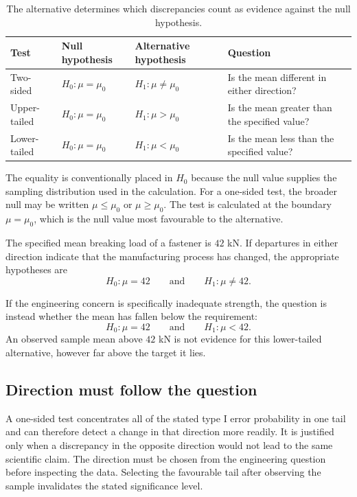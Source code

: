 \begin{table}[htbp]
\centering
\caption{The alternative determines which discrepancies count as evidence against the null hypothesis.}
\label{tab:alternative-directions}
\begin{tabularx}{\textwidth}{@{}lll>{\raggedright\arraybackslash}X@{}}
\toprule
Test & Null hypothesis & Alternative hypothesis & Question \\
\midrule
Two-sided & $H_0:\mu=\mu_0$ & $H_1:\mu\neq\mu_0$ & Is the mean different in either direction? \\
Upper-tailed & $H_0:\mu=\mu_0$ & $H_1:\mu>\mu_0$ & Is the mean greater than the specified value? \\
Lower-tailed & $H_0:\mu=\mu_0$ & $H_1:\mu<\mu_0$ & Is the mean less than the specified value? \\
\bottomrule
\end{tabularx}
\end{table}

The equality is conventionally placed in $H_0$ because the null value supplies the sampling distribution used in the calculation. For a one-sided test, the broader null may be written $\mu\leq\mu_0$ or $\mu\geq\mu_0$. The test is calculated at the boundary $\mu=\mu_0$, which is the null value most favourable to the alternative.

\begin{example}\par
The specified mean breaking load of a fastener is $42$ kN. If departures in either direction indicate that the manufacturing process has changed, the appropriate hypotheses are
\[
H_0:\mu=42
\qquad\text{and}\qquad
H_1:\mu\neq42.
\]

If the engineering concern is specifically inadequate strength, the question is instead whether the mean has fallen below the requirement:
\[
H_0:\mu=42
\qquad\text{and}\qquad
H_1:\mu<42.
\]
An observed sample mean above $42$ kN is not evidence for this lower-tailed alternative, however far above the target it lies.
\end{example}

\subsection{Direction must follow the question}

A one-sided test concentrates all of the stated type I error probability in one tail and can therefore detect a change in that direction more readily. It is justified only when a discrepancy in the opposite direction would not lead to the same scientific claim. The direction must be chosen from the engineering question before inspecting the data. Selecting the favourable tail after observing the sample invalidates the stated significance level.

